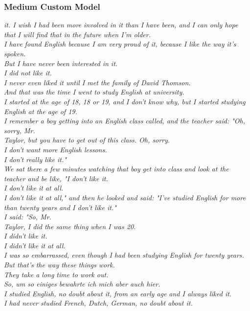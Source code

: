 \documentclass{scrartcl}
\begin{document}
\subsubsection{Medium Custom Model}
{\itshape
 it.
I wish I had been more involved in it than I have been, and I can only hope that I will find that in the future when I'm older.
\\
I have found English because I am very proud of it, because I like the way it's spoken.
\\
But I have never been interested in it.
 \\
I did not like it.
 \\
I never even liked it until I met the family of David Thomson.
\\
And that was the time I went to study English at university.
\\
I started at the age of 18, 18 or 19, and I don't know why, but I started studying English at the age of 19.
\\
I remember a boy getting into an English class called, and the teacher said: "Oh, sorry, Mr.
\\
Taylor, but you have to get out of this class.
Oh, sorry.
\\
I don't want more English lessons.
\\
I don't really like it."
\\
We sat there a few minutes watching that boy get into class and look at the teacher and be like, "I don't like it.
\\
I don't like it at all.
\\
I don't like it at all," and then he looked and said: "I've studied English for more than twenty years and I don't like it."
\\
I said: "So, Mr.
\\
Taylor, I did the same thing when I was 20.
\\
I didn't like it.
\\
I didn't like it at all.
\\
I was so embarrassed, even though I had been studying English for twenty years.
\\
But that's the way these things work.
\\
They take a long time to work out.
\\
So, um so einiges bewahrte ich mich aber auch hier.
\\
I studied English, no doubt about it, from an early age and I always liked it.
\\
I had never studied French, Dutch, German, no doubt about it.
}
\end{document}
